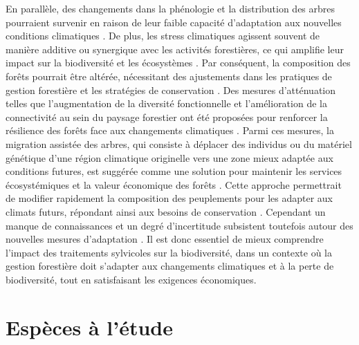 En parallèle, des changements dans la phénologie et la distribution des arbres pourraient survenir en raison de leur faible capacité d'adaptation aux nouvelles conditions climatiques \citep{Aitken2008Adaptationmigration,Chuine2010Whydoes,Zhu2012Failuremigrate,Gray2013Trackingsuitable}.
De plus, les stress climatiques agissent souvent de manière additive ou synergique avec les activités forestières, ce qui amplifie leur impact sur la biodiversité et les écosystèmes \citep{Brook2008Synergiesextinction,Tremblay2018Harvestinginteracts,Ochs2022Responseterrestrial,Bouderbala2023Longtermeffect}. 
Par conséquent, la composition des forêts pourrait être altérée, nécessitant des ajustements dans les pratiques de gestion forestière et les stratégies de conservation \citep{McKenney2009Climatechange,Chmura2011Forestresponses,Lo2011Linkingclimate}.
Des mesures d'atténuation telles que l'augmentation de la diversité fonctionnelle et l'amélioration de la connectivité au sein du paysage forestier ont été proposées pour renforcer la résilience des forêts face aux changements climatiques \citep{Messier2019functionalcomplex}.
Parmi ces mesures, la migration assistée des arbres, qui consiste à déplacer des individus ou du matériel génétique d'une région climatique originelle vers une zone mieux adaptée aux conditions futures, 
est suggérée comme une solution pour maintenir les services écosystémiques et la valeur économique des forêts \citep{Vitt2010Assistedmigration,Pedlar2011implementationassisted,Ste-Marie2011Assistedmigration,Winder2011Ecologicalimplications}. 
Cette approche permettrait de modifier rapidement la composition des peuplements pour les adapter aux climats futurs, répondant ainsi aux besoins de conservation \citep{Dumroese2015Considerationsrestoring,Park2018Informationunderload,Park2023Provenancetrials}. 
Cependant un manque de connaissances et un degré d'incertitude subsistent toutefois autour des nouvelles mesures d'adaptation \citep{Klenk2015assistedmigration,Park2018Informationunderload}. 
Il est donc essentiel de mieux comprendre l'impact des traitements sylvicoles sur la biodiversité, dans un contexte où la gestion forestière doit s'adapter aux changements climatiques et à la perte de biodiversité, tout en satisfaisant les exigences économiques. 


\section*{Espèces à l'étude}
\label{sec:species}

